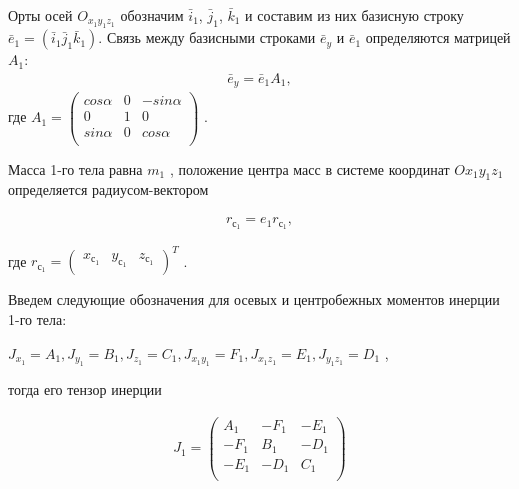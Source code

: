 \begin{enumerate}
	Орты осей $O_{x_1y_1z_1}$ обозначим $\bar{i}_1$, $\bar{j}_1$, $\bar{k}_1$ и составим из них базисную строку $\bar{e}_1 = (\bar{i}_1 \bar{j}_1 \bar{k}_1)$. Связь между базисными строками $\bar{e}_y$ и $\bar{e}_1$ определяются матрицей $A_1$:
	\begin{equation}
	\label{eq:p3:2}
	\begin{alignedat}{2}
	\bar{e}_y = \bar{e}_1	A_1 ,
	\end{alignedat}
	\end{equation}
	где  \( A_{1}= \left( \begin{matrix}
	cos \alpha   &  0  &  -sin \alpha \\
	0  &  1  &  0\\
	sin \alpha   &  0  &  cos \alpha \\
	\end{matrix}
	\right)  \) .\par
	
	Масса 1-го тела равна  \( m_{1} \) , положение центра масс в системе координат  \( Ox_{1}y_{1}z_{1} \)  определяется радиусом-вектором\par
	
	\begin{equation}
	\label{eq:p3:3}
	\begin{alignedat}{2}
	r_{с_{1}}=e_{1}r_{с_{1}},
	\end{alignedat}
	\end{equation}
	
	где  \( r_{с_{1}}= \left( \begin{matrix}
	x_{с_{1}}  &  y_{с_{1}}  &  z_{с_{1}}\\
	\end{matrix}
	\right) ^{T} \) .\par
	Введем следующие обозначения для осевых и центробежных моментов инерции 1-го тела:\par
	
	\( J_{x_{1}}=A_{1},J_{y_{1}}=B_{1},J_{z_{1}}=C_{1},J_{x_{1}y_{1}}=F_{1},J_{x_{1}z_{1}}=E_{1},J_{y_{1}z_{1}}=D_{1} \) ,\par
	
	тогда его тензор инерции\par
	
	\begin{equation}
	\label{eq:p3:4}
	\begin{alignedat}{2}
	J_{1}= \left( \begin{matrix}
	A_{1}  &  -F_{1}  &  -E_{1}\\
	-F_{1}  &  B_{1}  &  -D_{1}\\
	-E_{1}  &  -D_{1}  &  C_{1}\\
	\end{matrix}
	\right) 
	\end{alignedat}
	\end{equation}
		

\end{enumerate}
